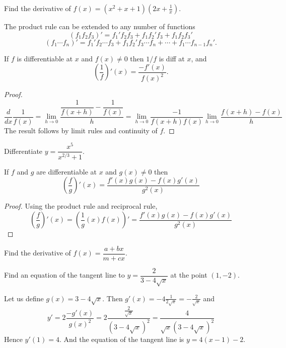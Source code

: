 \documentclass[calc1-main.tex]{subfiles}
\begin{document}
  \begin{example}
    Find the derivative of $f(x) = (x^2+x+1)(2x + \frac{1}{x})$.
  \end{example}

  The product rule can be extended to any number of functions
  \[
    (f_1 f_2 f_3)' = f_1' f_2 f_3 + f_1 f_2' f_3  + f_1 f_2 f_3'
  \]
  \[
    (f_1 \cdots f_n)' = f_1' f_2 \cdots f_3 + f_1 f_2' f_3 \cdots f_n + \cdots + f_1 \cdots f_{n-1} f_n'.
  \]

  \begin{theorem}
    If $f$ is differentiable at $x$ and $f(x) \neq 0$ then $1/f$ is diff at $x$, and
    \[
      \left(\dfrac{1}{f} \right)'(x) = \dfrac{-f'(x)}{f(x)^2}.
    \]
  \end{theorem}
  \begin{proof}
    \[
      \dfrac{d}{dx} \dfrac{1}{f(x)} = \lim_{h \to 0} \frac{\dfrac{1}{f(x+h)}-\dfrac{1}{f(x)}}{h} = \lim_{h \to 0} \dfrac{-1}{f(x+h) f(x)} \lim_{h \to 0} \dfrac{f(x+h)-f(x)}{h}
    \]
    The result follows by limit rules and continuity of $f$.
  \end{proof}

  \begin{example}
    Differentiate $y = \dfrac{x^5}{x^{2/3} + 1}$.
  \end{example}

  \begin{theorem}
    If $f$ and $g$ are differentiable at $x$ and $g(x) \neq 0$ then
    \[
      \left( \dfrac{f}{g} \right)'(x) =
      \dfrac{f'(x) g(x) - f(x) g'(x)}{g^2(x)}
    \]
  \end{theorem}
  \begin{proof}
    Using the product rule and reciprocal rule,
    \[
      \left( \dfrac{f}{g} \right)'(x) = \left( \dfrac{1}{g}(x) f(x) \right)' = \dfrac{f'(x) g(x) - f(x) g'(x)}{g^2(x)}
    \]
  \end{proof}

  \begin{example}
    Find the derivative of $f(x) = \dfrac{a + b x}{m + c x}$.
  \end{example}

  \begin{example}
    Find an equation of the tangent line to $y = \dfrac{2}{3-4 \sqrt{x}}$ at the point $(1, -2)$.
  \end{example}
  \begin{solution}
    Let us define $g(x)=3-4\sqrt{x}$. Then $g'(x)=-4 \frac{1}{2\sqrt{x}}=-\frac{2}{\sqrt{x}}$ and
    \[
      y'=2 \frac{-g'(x)}{g(x)^2}
      =2 \frac{\frac{2}{\sqrt{x}}}{(3-4\sqrt{x})^2}
      =\frac{4}{\sqrt{x}(3-4\sqrt{x})^2}
    \]
    Hence $y'(1)=4$. And the equation of the tangent line is $y=4(x-1)-2$.
  \end{solution}
\end{document}
